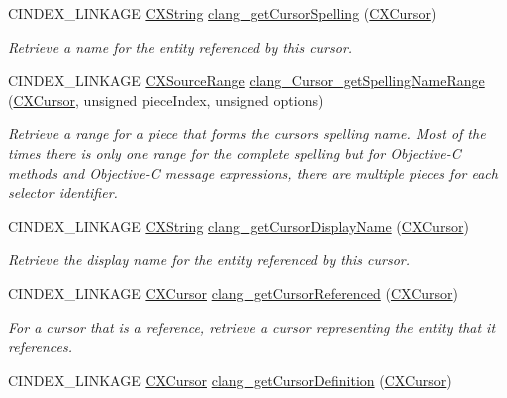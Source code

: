 \begin{DoxyCompactItemize}
\mbox{\label{group__CINDEX__CURSOR__XREF_gaad1c9b2a1c5ef96cebdbc62f1671c763}} 
C\+I\+N\+D\+E\+X\+\_\+\+L\+I\+N\+K\+A\+GE \hyperlink{structCXString}{C\+X\+String} \hyperlink{group__CINDEX__CURSOR__XREF_gaad1c9b2a1c5ef96cebdbc62f1671c763}{clang\+\_\+get\+Cursor\+Spelling} (\hyperlink{structCXCursor}{C\+X\+Cursor})
\begin{DoxyCompactList}\small\item\em Retrieve a name for the entity referenced by this cursor. \end{DoxyCompactList}\item 
C\+I\+N\+D\+E\+X\+\_\+\+L\+I\+N\+K\+A\+GE \hyperlink{structCXSourceRange}{C\+X\+Source\+Range} \hyperlink{group__CINDEX__CURSOR__XREF_ga251b31de80fd14681edf46f43b0bd03b}{clang\+\_\+\+Cursor\+\_\+get\+Spelling\+Name\+Range} (\hyperlink{structCXCursor}{C\+X\+Cursor}, unsigned piece\+Index, unsigned options)
\begin{DoxyCompactList}\small\item\em Retrieve a range for a piece that forms the cursors spelling name. Most of the times there is only one range for the complete spelling but for Objective-\/C methods and Objective-\/C message expressions, there are multiple pieces for each selector identifier. \end{DoxyCompactList}\item 
C\+I\+N\+D\+E\+X\+\_\+\+L\+I\+N\+K\+A\+GE \hyperlink{structCXString}{C\+X\+String} \hyperlink{group__CINDEX__CURSOR__XREF_gac3eba3224d109a956f9ef96fd4fe5c83}{clang\+\_\+get\+Cursor\+Display\+Name} (\hyperlink{structCXCursor}{C\+X\+Cursor})
\begin{DoxyCompactList}\small\item\em Retrieve the display name for the entity referenced by this cursor. \end{DoxyCompactList}\item 
C\+I\+N\+D\+E\+X\+\_\+\+L\+I\+N\+K\+A\+GE \hyperlink{structCXCursor}{C\+X\+Cursor} \hyperlink{group__CINDEX__CURSOR__XREF_gabf059155921552e19fc2abed5b4ff73a}{clang\+\_\+get\+Cursor\+Referenced} (\hyperlink{structCXCursor}{C\+X\+Cursor})
\begin{DoxyCompactList}\small\item\em For a cursor that is a reference, retrieve a cursor representing the entity that it references. \end{DoxyCompactList}\item 
C\+I\+N\+D\+E\+X\+\_\+\+L\+I\+N\+K\+A\+GE \hyperlink{structCXCursor}{C\+X\+Cursor} \hyperlink{group__CINDEX__CURSOR__XREF_gafcfbec461e561bf13f1e8540bbbd655b}{clang\+\_\+get\+Cursor\+Definition} (\hyperlink{structCXCursor}{C\+X\+Cursor})

\end{DoxyCompactItemize}
